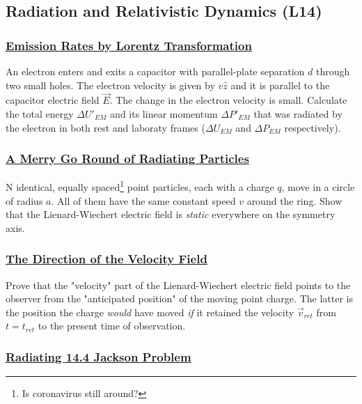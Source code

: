 
\subsection{Radiation and Relativistic Dynamics (\textbf{L14})}

\subsubsection{\hyperref[Emission Rates by Lorentz Transformation]{Emission Rates by Lorentz Transformation}}

An electron enters and exits a capacitor with parallel-plate separation $d$ through two small holes. The electron velocity is given by $v \hat{z}$ and it is parallel to the capacitor electric field $\vec{E}$. The change in the electron velocity is small. Calculate the total energy $\Delta U'_{EM}$ and its linear momentum $\Delta P'_{EM}$ that was radiated by the electron in both rest and laboraty frames ($\Delta U_{EM}$ and  $\Delta P_{EM}$ respectively).

\subsubsection{\hyperref[A Merry Go Round of Radiating Particles]{A Merry Go Round of Radiating Particles}}

N identical, equally spaced\footnote{Is coronavirus still around?} point particles, each with a charge $q$, move in a circle of radius $a$. All of them have the same constant speed $v$ around the ring. Show that the Lienard-Wiechert electric field is \textit{static} everywhere on the symmetry axis.

\subsubsection{\hyperref[The Direction of the Velocity Field]{The Direction of the Velocity Field}}

Prove that the "velocity" part of the Lienard-Wiechert electric field points to the observer from the "anticipated position" of the moving point charge. The latter is the position the charge \textit{would} have moved \textit{if} it retained the velocity $\vec{v}_{ret}$ from $t = t_{ret}$ to the present time of observation.

\subsubsection{\hyperref[Radiating 14.4 Jackson Problem]{Radiating 14.4 Jackson Problem}}


